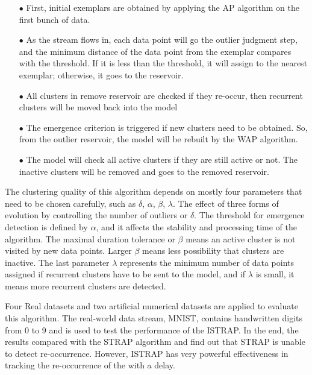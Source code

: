 \documentclass[../UNBThesis2.tex]{subfiles}
\begin{document}
\begin{itemize}[leftmargin=*]
\begin{itemize}
    \item[$\bullet$] First, initial exemplars are obtained by applying the AP algorithm on the first bunch of data.
    \item[$\bullet$] As the stream flows in, each data point will go the outlier judgment step, and the minimum distance of the data point from the exemplar compares with the threshold. If it is less than the threshold, it will assign to the nearest exemplar; otherwise, it goes to the reservoir.
    \item[$\bullet$] All clusters in remove reservoir are checked if they re-occur, then recurrent clusters will be moved back into the model
    \item[$\bullet$] The emergence criterion is triggered if new clusters need to be obtained. So, from the outlier reservoir, the model will be rebuilt by the WAP algorithm.
    \item[$\bullet$] The model will check all active clusters if they are still active or not. The inactive clusters will be removed and goes to the removed reservoir.
\end{itemize}

The clustering quality of this algorithm depends on mostly four parameters that need to be chosen carefully, such as $\delta$, $\alpha$, $\beta$, $\lambda$. The effect of three forms of evolution by controlling the number of outliers or $\delta$. The threshold for emergence detection is defined by $\alpha$, and it affects the stability and processing time of the algorithm. The maximal duration tolerance or $\beta$ means an active cluster is not visited by new data points. Larger $\beta$ means less possibility that clusters are inactive. The last parameter $\lambda$ represents the minimum number of data points assigned if recurrent clusters have to be sent to the model, and if $\lambda$ is small, it means more recurrent clusters are detected. 

Four Real datasets and two artificial numerical datasets are applied to evaluate this algorithm. The real-world data stream,  MNIST, contains handwritten digits from 0 to 9 and is used to test the performance of the ISTRAP. In the end, the results compared with the STRAP algorithm and find out that STRAP is unable to detect re-occurrence. However, ISTRAP has very powerful effectiveness in tracking the re-occurrence of the with a delay.








\end{itemize}
\end{document}

